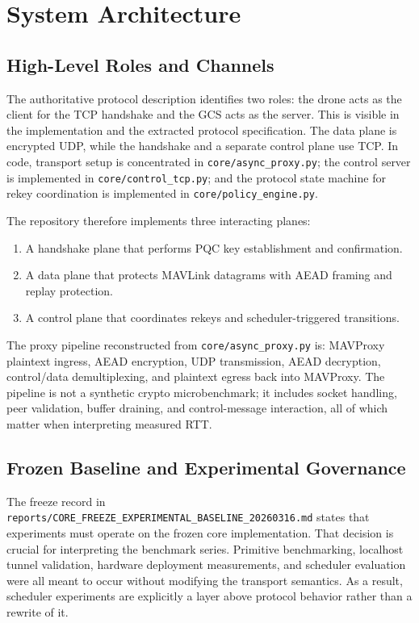 \documentclass[11pt]{article}
\begin{document}
\section{System Architecture}
\subsection{High-Level Roles and Channels}
The authoritative protocol description identifies two roles: the drone acts as the client for the TCP handshake and the GCS acts as the server. This is visible in the implementation and the extracted protocol specification. The data plane is encrypted UDP, while the handshake and a separate control plane use TCP. In code, transport setup is concentrated in \texttt{core/async\_proxy.py}; the control server is implemented in \texttt{core/control\_tcp.py}; and the protocol state machine for rekey coordination is implemented in \texttt{core/policy\_engine.py}.

The repository therefore implements three interacting planes:
\begin{enumerate}[leftmargin=*]
\item A handshake plane that performs PQC key establishment and confirmation.
\item A data plane that protects MAVLink datagrams with AEAD framing and replay protection.
\item A control plane that coordinates rekeys and scheduler-triggered transitions.
\end{enumerate}

The proxy pipeline reconstructed from \texttt{core/async\_proxy.py} is: MAVProxy plaintext ingress, AEAD encryption, UDP transmission, AEAD decryption, control/data demultiplexing, and plaintext egress back into MAVProxy. The pipeline is not a synthetic crypto microbenchmark; it includes socket handling, peer validation, buffer draining, and control-message interaction, all of which matter when interpreting measured RTT.

\subsection{Frozen Baseline and Experimental Governance}
The freeze record in \texttt{reports/CORE\_FREEZE\_EXPERIMENTAL\_BASELINE\_20260316.md} states that experiments must operate on the frozen core implementation. That decision is crucial for interpreting the benchmark series. Primitive benchmarking, localhost tunnel validation, hardware deployment measurements, and scheduler evaluation were all meant to occur without modifying the transport semantics. As a result, scheduler experiments are explicitly a layer above protocol behavior rather than a rewrite of it.
\end{document}
